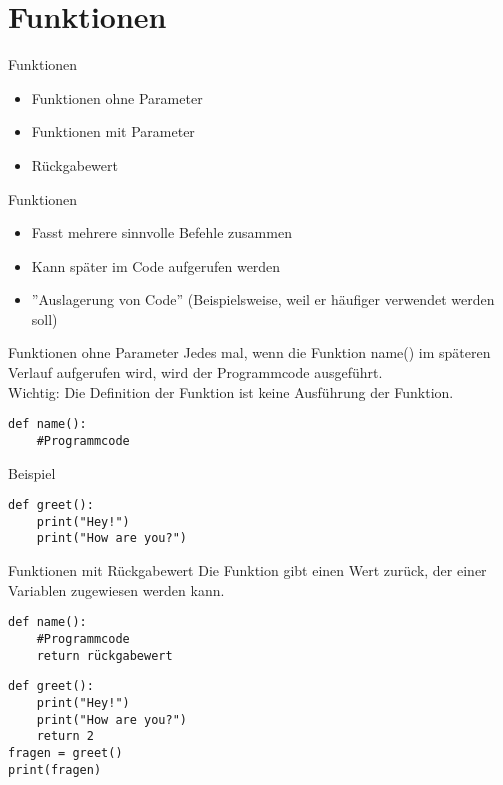 \section{Funktionen}
\begin{frame}[fragile]{Funktionen}
\begin{itemize}
	\item Funktionen ohne Parameter
	\item Funktionen mit Parameter
	\item Rückgabewert 
\end{itemize}
\end{frame}

\begin{frame}[fragile]{Funktionen}
	\begin{itemize}
		\item Fasst mehrere sinnvolle Befehle zusammen
		\item Kann später im Code aufgerufen werden
		\item ''Auslagerung von Code'' (Beispielsweise, weil er häufiger verwendet werden soll)
	\end{itemize}
\end{frame}

\begin{frame}[fragile]{Funktionen ohne Parameter}
Jedes mal, wenn die Funktion name() im späteren Verlauf aufgerufen wird, wird der Programmcode ausgeführt. \\
Wichtig: Die Definition der Funktion ist keine Ausführung der Funktion.
\begin{lstlisting}
def name():
	#Programmcode
\end{lstlisting}

Beispiel
\begin{lstlisting}
def greet():
    print("Hey!")
    print("How are you?")
\end{lstlisting}
\end{frame}

\begin{frame}[fragile]{Funktionen mit Rückgabewert}
Die Funktion gibt einen Wert zurück, der einer Variablen zugewiesen werden kann.
\begin{lstlisting}
def name():
	#Programmcode
	return rückgabewert
\end{lstlisting}

\begin{lstlisting}
def greet():
	print("Hey!")
	print("How are you?")
	return 2
fragen = greet()
print(fragen)
\end{lstlisting}
\end{frame}

